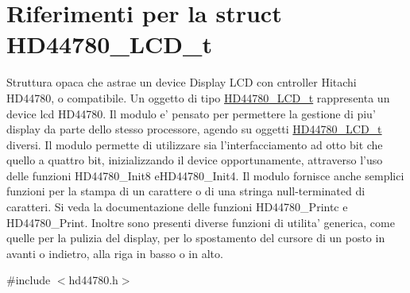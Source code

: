 \hypertarget{struct_h_d44780___l_c_d__t}{\section{Riferimenti per la struct H\+D44780\+\_\+\+L\+C\+D\+\_\+t}
\label{struct_h_d44780___l_c_d__t}
}


Struttura opaca che astrae un device Display L\+C\+D con cntroller Hitachi H\+D44780, o compatibile. Un oggetto di tipo \hyperlink{struct_h_d44780___l_c_d__t}{H\+D44780\+\_\+\+L\+C\+D\+\_\+t} rappresenta un device lcd H\+D44780. Il modulo e' pensato per permettere la gestione di piu' display da parte dello stesso processore, agendo su oggetti \hyperlink{struct_h_d44780___l_c_d__t}{H\+D44780\+\_\+\+L\+C\+D\+\_\+t} diversi. Il modulo permette di utilizzare sia l'interfacciamento ad otto bit che quello a quattro bit, inizializzando il device opportunamente, attraverso l'uso delle funzioni H\+D44780\+\_\+\+Init8 e\+H\+D44780\+\_\+\+Init4. Il modulo fornisce anche semplici funzioni per la stampa di un carattere o di una stringa null-\/terminated di caratteri. Si veda la documentazione delle funzioni H\+D44780\+\_\+\+Printc e H\+D44780\+\_\+\+Print. Inoltre sono presenti diverse funzioni di utilita' generica, come quelle per la pulizia del display, per lo spostamento del cursore di un posto in avanti o indietro, alla riga in basso o in alto.  




{\ttfamily \#include $<$hd44780.\+h$>$}

